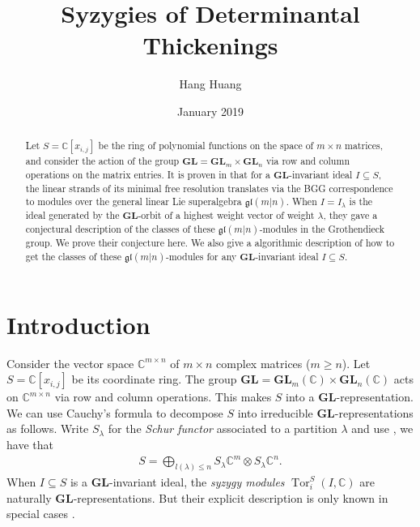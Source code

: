 \documentclass[12pt]{amsart}
\title{Syzygies of Determinantal Thickenings}
\author{Hang Huang}
\date{January 2019}
\theoremstyle{definition}
\theoremstyle{remark}
\newcommand{\bbC}{\mathbb{C}}
\newcommand{\dsum}{\bigoplus}
\newcommand{\GL}{\mathbf{GL}}
\newcommand{\gl}{\mathfrak{gl}}
\newcommand{\Tor}{\operatorname{Tor}}
\newcommand{\DS}{\displaystyle}
\numberwithin{equation}{section}
\begin{document}
\begin{abstract}
Let $S = \bbC[x_{i,j}]$ be the ring of polynomial functions on the space of $m \times n$ matrices, and consider the action of the group $\GL = \GL_m \times \GL_n$ via row and column operations on the matrix entries. It is proven in \cite{RW} that for a $\GL$-invariant ideal $I \subseteq S$, the linear strands of its minimal free resolution translates via the BGG correspondence to modules over the general linear Lie superalgebra $\gl(m|n)$. When $I=I_{\lambda}$ is the ideal generated by the $\GL$-orbit of a highest weight vector of weight $\lambda$, they gave a conjectural description of the classes of these $\gl(m|n)$-modules in the Grothendieck group. We prove their conjecture here. We also give a algorithmic description of how to get the classes of these $\gl(m|n)$-modules for any $\GL$-invariant ideal $I \subseteq S$. 
\end{abstract}


\maketitle

\section{Introduction} \label{Introduction}

Consider the vector space $\bbC^{m \times n}$ of $m \times n$ complex matrices ($m \geq n$). Let $S = \bbC[x_{i,j}]$ be its coordinate ring. The group $\GL = \GL_m(\bbC) \times \GL_n(\bbC)$ acts on $\bbC^{m \times n}$ via row and column operations. This makes $S$ into a $\GL$-representation. We can use Cauchy's formula to decompose $S$ into irreducible $\GL$-representations as follows. Write $S_{\lambda}$ for the \emph{Schur functor} associated to a partition $\lambda$ and use \cite[Corollary 2.3.3]{Wey03}, we have that
\begin{align} \label{Cauchy}
\DS S = \dsum_{l(\lambda) \leq n} S_{\lambda} \bbC^m \otimes S_{\lambda} \bbC^n.
\end{align}
When $I \subseteq S$ is a $\GL$-invariant ideal, the \emph{syzygy modules} $\Tor_i^S (I,\bbC)$ are naturally $\GL$-representations. But their explicit description is only known in special cases \cite{Las78} \cite{ABW81} \cite{PW85} \cite{RW17}. 
\end{document}
